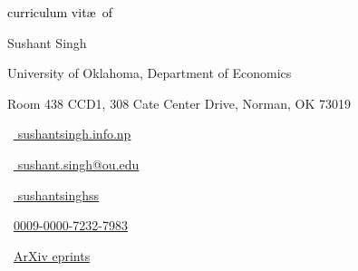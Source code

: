 \begin{scriptsize}
	 \textcolor{black}{curriculum vit\ae~of}
\end{scriptsize}

\vspace*{-0.10em}
\begin{Large} 
	Sushant Singh
\end{Large}

\vspace*{0.25em}
\begin{scshape}
	\begin{footnotesize}
		  \textcolor{highlight2}{University of Oklahoma, Department of Economics}
		  
		  \vspace*{-1ex}
		  \textcolor{highlight2}{Room 438 CCD1, 308 Cate Center Drive,
Norman, OK 73019}
	\end{footnotesize}
\end{scshape}
\vspace*{0.4cm}

\begin{footnotesize}
	\begin{tiny}\faHome\end{tiny}~\href{https://www.sushantsingh.info.np/}{
		sushantsingh.info.np
	}
	\quad \begin{tiny}\faEnvelope[regular]\end{tiny}~\href{mailto:sushant.singh@ou.edu}{%
		sushant.singh@ou.edu
		}
		
		
	\quad 
	\begin{tiny}\faLinkedinIn\end{tiny}~\href{https://www.linkedin.com/in/sushantsinghss/}{
		sushantsinghss
	}
	\quad 
	\begin{tiny}\aiOrcid\end{tiny}~\href{https://orcid.org/0009-0000-7232-7983}{0009-0000-7232-7983}
\quad
\begin{tiny}\aiarXiv\end{tiny}~\href{https://arxiv.org/a/0009-0000-7232-7983.html}{ArXiv eprints}


	

\end{footnotesize}
